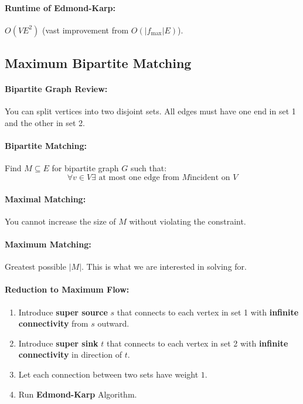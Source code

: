 \documentclass[a4paper,12pt]{report}
\begin{document}
\paragraph{Runtime of Edmond-Karp: } $O(VE^2)$ (vast improvement from $O(|f_{\max}|E)$).






\subsection{Maximum Bipartite Matching}

\paragraph{Bipartite Graph Review: } You can split vertices into two disjoint sets. All edges must have one end in set 1 and the other in set 2. 

\paragraph{Bipartite Matching: } Find $M\subseteq E$ for bipartite graph $G$ such that: 
\begin{equation}
\forall v\in V \exists \text{ at most one edge from } M \text{incident on } V
\end{equation}

\paragraph{Maximal Matching: } You cannot increase the size of $M$ without violating the constraint.

\paragraph{Maximum Matching: } Greatest possible $|M|$. This is what we are interested in solving for.

\paragraph{Reduction to Maximum Flow: } 
\begin{enumerate}
\item Introduce \textbf{super source} $s$ that connects to each vertex in set 1 with \textbf{infinite connectivity} from $s$ outward.
\item Introduce \textbf{super sink} $t$ that connects to each vertex in set 2 with \textbf{infinite connectivity} in direction of $t$.
\item Let each connection between two sets have weight $1$.
\item Run \textbf{Edmond-Karp} Algorithm. 
\end{enumerate}
\end{document}
